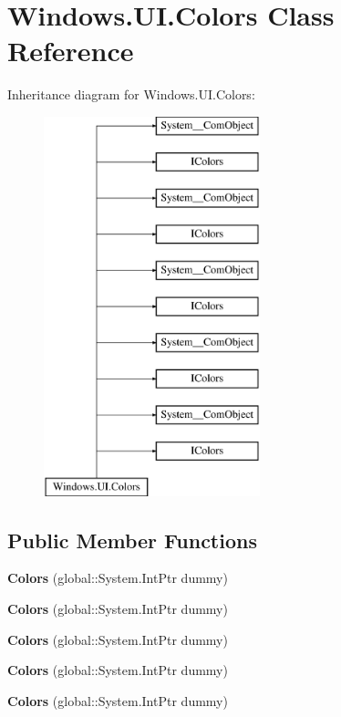 \hypertarget{class_windows_1_1_u_i_1_1_colors}{}\section{Windows.\+U\+I.\+Colors Class Reference}
\label{class_windows_1_1_u_i_1_1_colors}
Inheritance diagram for Windows.\+U\+I.\+Colors\+:\begin{figure}[H]
\begin{center}
\leavevmode
\includegraphics[height=11.000000cm]{class_windows_1_1_u_i_1_1_colors}
\end{center}
\end{figure}
\subsection*{Public Member Functions}
\begin{DoxyCompactItemize}
\item 
\mbox{\label{class_windows_1_1_u_i_1_1_colors_a77525230e4b2d76be937d3d2151ddd06}} 
{\bfseries Colors} (global\+::\+System.\+Int\+Ptr dummy)
\item 
\mbox{\label{class_windows_1_1_u_i_1_1_colors_a77525230e4b2d76be937d3d2151ddd06}} 
{\bfseries Colors} (global\+::\+System.\+Int\+Ptr dummy)
\item 
\mbox{\label{class_windows_1_1_u_i_1_1_colors_a77525230e4b2d76be937d3d2151ddd06}} 
{\bfseries Colors} (global\+::\+System.\+Int\+Ptr dummy)
\item 
\mbox{\label{class_windows_1_1_u_i_1_1_colors_a77525230e4b2d76be937d3d2151ddd06}} 
{\bfseries Colors} (global\+::\+System.\+Int\+Ptr dummy)
\item 
\mbox{\label{class_windows_1_1_u_i_1_1_colors_a77525230e4b2d76be937d3d2151ddd06}} 
{\bfseries Colors} (global\+::\+System.\+Int\+Ptr dummy)
\end{DoxyCompactItemize}
